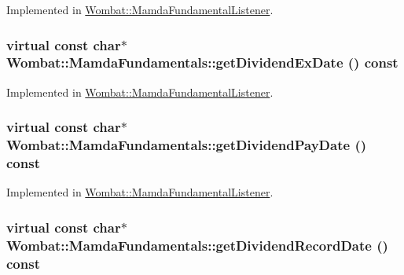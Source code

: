Implemented in \hyperlink{classWombat_1_1MamdaFundamentalListener_233a245991d21d70fb6972091bb56c84}{Wombat::Mamda\-Fundamental\-Listener}.\hypertarget{classWombat_1_1MamdaFundamentals_236eb051f36fd73186ed6f19ffd6d4b9}{
\subsubsection[getDividendExDate]{\setlength{\rightskip}{0pt plus 5cm}virtual const char$\ast$ Wombat::Mamda\-Fundamentals::get\-Dividend\-Ex\-Date () const}}
\label{classWombat_1_1MamdaFundamentals_236eb051f36fd73186ed6f19ffd6d4b9}




Implemented in \hyperlink{classWombat_1_1MamdaFundamentalListener_063a6648c273949792d6ebdf740ce956}{Wombat::Mamda\-Fundamental\-Listener}.\hypertarget{classWombat_1_1MamdaFundamentals_897da92a45e76b87d54f6196a99b2c7e}{
\subsubsection[getDividendPayDate]{\setlength{\rightskip}{0pt plus 5cm}virtual const char$\ast$ Wombat::Mamda\-Fundamentals::get\-Dividend\-Pay\-Date () const}}
\label{classWombat_1_1MamdaFundamentals_897da92a45e76b87d54f6196a99b2c7e}




Implemented in \hyperlink{classWombat_1_1MamdaFundamentalListener_4f4c19ac596754914a59a2389eeac5bc}{Wombat::Mamda\-Fundamental\-Listener}.\hypertarget{classWombat_1_1MamdaFundamentals_4606684f0bdf3fa9a9a87e51eb0a7c99}{
\subsubsection[getDividendRecordDate]{\setlength{\rightskip}{0pt plus 5cm}virtual const char$\ast$ Wombat::Mamda\-Fundamentals::get\-Dividend\-Record\-Date () const}}
\label{classWombat_1_1MamdaFundamentals_4606684f0bdf3fa9a9a87e51eb0a7c99}




